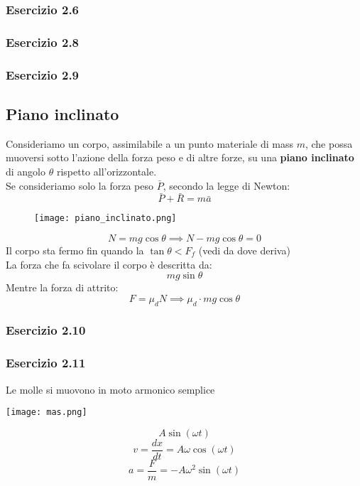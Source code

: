 \documentclass[../../main.tex]{subfiles}
\begin{document}
\subsubsection{Esercizio 2.6}

\subsubsection{Esercizio 2.8}

\subsubsection{Esercizio 2.9}

\subsection{Piano inclinato}
Consideriamo un corpo, assimilabile a un punto materiale di mass $m$, che possa muoversi sotto l'azione della forza peso e di altre forze, su una \textbf{piano inclinato} di angolo $\theta$ rispetto all'orizzontale.\\
Se consideriamo solo la forza peso $\bar P$, secondo la legge di Newton:
\[
    \bar P + \bar R = m\bar a
\]
\begin{figure}[H]
    \centering
    \texttt{[image: piano\_inclinato.png]}
\end{figure}
\[
    N = mg\cos\theta \implies N - mg\cos\theta = 0
\]
Il corpo sta fermo fin quando la $\tan\theta < F_f$ (vedi da dove deriva)\\
La forza che fa scivolare il corpo è descritta da:
\[
    mg\sin\theta
\]
Mentre la forza di attrito:
\[
    F = \mu_d N \implies \mu_d \cdot mg\cos\theta
\]

\subsubsection{Esercizio 2.10}

\subsubsection{Esercizio 2.11}

Le molle si muovono in moto armonico semplice\\
\begin{minipage}{0.5\textwidth}
    \centering
    \texttt{[image: mas.png]}
\end{minipage}
\begin{minipage}{0.5\textwidth}
    \centering
    \[
        A\sin(\omega t)
    \]
    \[
        v = \dfrac{dx}{dt} = A\omega\cos(\omega t)
    \]
    \[
        a = \dfrac{F}{m} = -A\omega^2\sin(\omega t)
    \]
\end{minipage}
\end{document}
